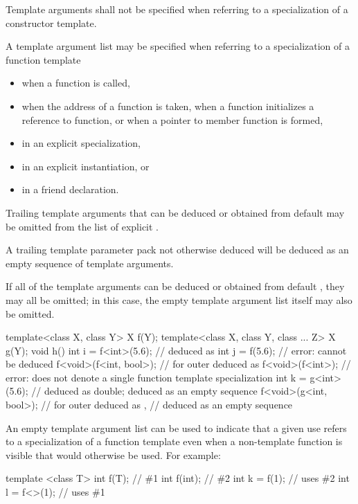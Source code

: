 \pnum
Template arguments shall not be specified
when referring to a specialization of
a constructor template.

\pnum
A template argument list may be specified when referring to a specialization
of a function template
\begin{itemize}
\item
when a function is called,
\item
when the address of a function is taken, when a function initializes a
reference to function, or when a pointer to member function is formed,
\item
in an explicit specialization,
\item
in an explicit instantiation, or
\item
in a friend declaration.
\end{itemize}

\pnum
Trailing template arguments that can be deduced or
obtained from default 
may be omitted from the list of explicit .
\begin{note}
A trailing template parameter pack not otherwise deduced will be
deduced as an empty sequence of template arguments.
\end{note}
If all of the template arguments can be
deduced or obtained from default ,
they may all be omitted;
in this case, the empty template argument list \tcode{<>}
itself may also be omitted.
\begin{example}
\begin{codeblock}
template<class X, class Y> X f(Y);
template<class X, class Y, class ... Z> X g(Y);
void h() {
  int i = f<int>(5.6);          //  deduced as 
  int j = f(5.6);               // error:  cannot be deduced
  f<void>(f<int, bool>);        //  for outer  deduced as 
  f<void>(f<int>);              // error:  does not denote a single function template specialization
  int k = g<int>(5.6);          //  deduced as double;  deduced as an empty sequence
  f<void>(g<int, bool>);        //  for outer  deduced as ,
                                //  deduced as an empty sequence
}
\end{codeblock}
\end{example}

\pnum
\begin{note}
An empty template argument list can be used to indicate that a given
use refers to a specialization of a function template even when a
non-template function is visible that would otherwise be used.
For example:

\begin{codeblock}
template <class T> int f(T);    // \#1
int f(int);                     // \#2
int k = f(1);                   // uses \#2
int l = f<>(1);                 // uses \#1
\end{codeblock}
\end{note}

